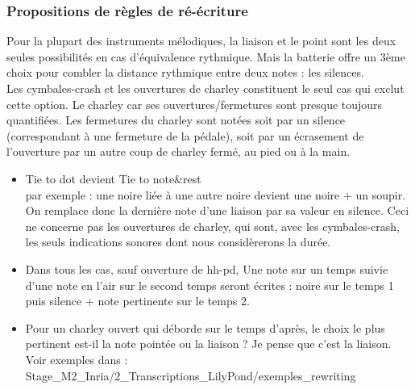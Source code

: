 \subsubsection*{Propositions de règles de ré-écriture}
Pour la plupart des instruments mélodiques, la liaison et le point sont les deux seules possibilités en cas d’équivalence rythmique. Mais la batterie offre un 3ème choix pour combler la distance rythmique entre deux notes : les silences.\\Les cymbales-crash et les ouvertures de charley constituent le seul cas qui exclut cette option. Le charley car ses ouvertures/fermetures sont presque toujours quantifiées. Les fermetures du charley sont notées soit par un silence (correspondant à une fermeture de la pédale), soit par un écrasement de l’ouverture par un autre coup de charley fermé, au pied ou à la main.
\begin{itemize}
\item 
Tie to dot devient Tie to note\&rest\\
par exemple : une noire liée à une autre noire devient une noire + un soupir.\\
On remplace donc la dernière note d’une liaison par sa valeur en silence.
Ceci ne concerne pas les ouvertures de charley, qui sont, avec les cymbales-crash, les seuls indications sonores dont nous considèrerons la durée.
\item 
Dans tous les cas, sauf ouverture de hh-pd, Une note sur un temps suivie d’une note en l’air sur le second temps seront écrites : noire sur le temps 1 puis silence + note pertinente sur le temps 2.
\item
Pour un charley ouvert qui déborde sur le temps d’après, le choix le plus pertinent est-il la note pointée ou la liaison ? Je pense que c’est la liaison.
Voir exemples dans :
Stage\_M2\_Inria/2\_Transcriptions\_LilyPond/exemples\_rewriting
\end{itemize}
